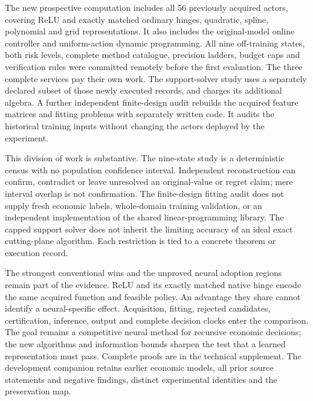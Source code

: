 The new prospective computation includes all 56 previously acquired actors,
covering ReLU and exactly matched ordinary hinges, quadratic, spline, polynomial
and grid representations. It also includes the original-model online controller
and uniform-action dynamic programming. All nine off-training states, both risk
levels, complete method catalogue, precision ladders, budget caps and verification
rules were committed remotely before the first evaluation. The three complete
services pay their own work. The support-solver study uses a separately declared
subset of those newly executed records, and charges its additional algebra.
A further independent finite-design audit rebuilds the acquired feature matrices
and fitting problems with separately written code. It audits the historical
training inputs without changing the actors deployed by the experiment.

This division of work is substantive. The nine-state study is a deterministic
census with no population confidence interval. Independent reconstruction can
confirm, contradict or leave unresolved an original-value or regret claim; mere
interval overlap is not confirmation. The finite-design fitting audit does not
supply fresh economic labels, whole-domain training validation, or an independent
implementation of the shared linear-programming library. The capped support
solver does not inherit the limiting accuracy of an ideal exact cutting-plane
algorithm. Each restriction is tied to a concrete theorem or execution record.

The strongest conventional wins and the unproved neural adoption regions remain
part of the evidence. ReLU and its exactly matched native hinge encode the same
acquired function and feasible policy. An advantage they share cannot identify a
neural-specific effect. Acquisition, fitting, rejected candidates, certification,
inference, output and complete decision clocks enter the comparison. The goal
remains a competitive neural method for recursive economic decisions; the new
algorithms and information bounds sharpen the test that a learned representation
must pass. Complete proofs are in the technical supplement. The development
companion retains earlier economic models, all prior source statements and
negative findings, distinct experimental identities and the preservation map.
